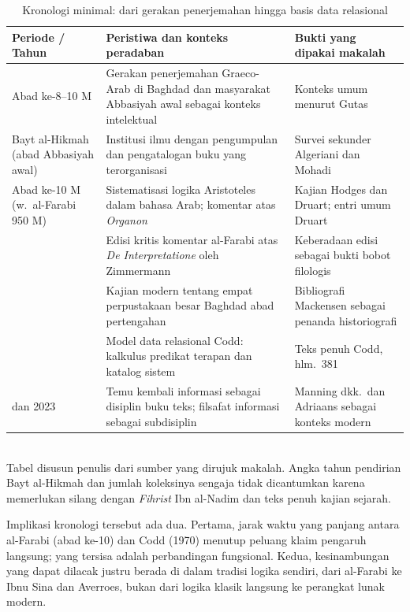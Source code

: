 \documentclass[12pt,a4paper]{article}
\begin{document}
\begin{table}[htbp]
\centering
\small
\caption{Kronologi minimal: dari gerakan penerjemahan hingga basis data relasional}
\label{tab:kronologi}
\renewcommand{\arraystretch}{1.25}
\begin{tabularx}{\textwidth}{@{}>{\raggedright\arraybackslash}p{2.8cm}>{\raggedright\arraybackslash}X>{\raggedright\arraybackslash}p{3.2cm}@{}}
\toprule
Periode / Tahun & Peristiwa dan konteks peradaban & Bukti yang dipakai makalah\\
\midrule
Abad ke-8--10 M & Gerakan penerjemahan Graeco-Arab di Baghdad dan masyarakat Abbasiyah awal sebagai konteks intelektual & Konteks umum menurut Gutas\autocite{gutas1998} \\
Bayt al-Hikmah (abad Abbasiyah awal) & Institusi ilmu dengan pengumpulan dan pengatalogan buku yang terorganisasi & Survei sekunder Algeriani dan Mohadi\autocite{algeriani-mohadi2017} \\
Abad ke-10 M (w.\ al-Farabi 950 M) & Sistematisasi logika Aristoteles dalam bahasa Arab; komentar atas \emph{Organon} & Kajian Hodges dan Druart; entri umum Druart\autocite{hodges-druart2019}\autocite{druart2024} \\
1981 & Edisi kritis komentar al-Farabi atas \emph{De Interpretatione} oleh Zimmermann & Keberadaan edisi sebagai bukti bobot filologis\autocite{zimmermann1981} \\
1932 & Kajian modern tentang empat perpustakaan besar Baghdad abad pertengahan & Bibliografi Mackensen sebagai penanda historiografi\autocite{mackensen1932} \\
1970 & Model data relasional Codd: kalkulus predikat terapan dan katalog sistem & Teks penuh Codd, hlm.\ 381\autocite[381]{codd1970} \\
2008 dan 2023 & Temu kembali informasi sebagai disiplin buku teks; filsafat informasi sebagai subdisiplin & Manning dkk.\ dan Adriaans sebagai konteks modern\autocite{manning2008}\autocite{adriaans2023} \\
\bottomrule
\end{tabularx}
\\[4pt]
{\footnotesize Tabel disusun penulis dari sumber yang dirujuk makalah. Angka tahun pendirian Bayt al-Hikmah dan jumlah koleksinya sengaja tidak dicantumkan karena memerlukan silang dengan \emph{Fihrist} Ibn al-Nadim dan teks penuh kajian sejarah.}
\end{table}

Implikasi kronologi tersebut ada dua. Pertama, jarak waktu yang panjang antara al-Farabi (abad ke-10) dan Codd (1970) menutup peluang klaim pengaruh langsung; yang tersisa adalah perbandingan fungsional. Kedua, kesinambungan yang dapat dilacak justru berada di dalam tradisi logika sendiri, dari al-Farabi ke Ibnu Sina dan Averroes, bukan dari logika klasik langsung ke perangkat lunak modern.
\end{document}
